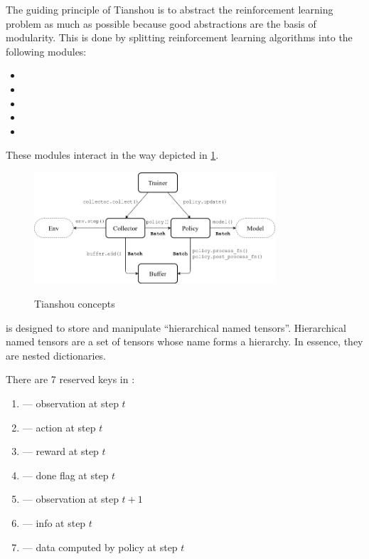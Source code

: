 The guiding principle of Tianshou is to abstract the reinforcement learning problem
as much as possible because good abstractions are the basis of modularity.
This is done by splitting reinforcement learning algorithms into the following modules:
\begin{itemize}
		\item {}
		\item {}
		\item {}
		\item {}
		\item {}
\end{itemize}

These modules interact in the way depicted in \ref{tianshou-concepts}.

\begin{figure}[htpb]
		\centering
		\includegraphics[width=0.8\textwidth]{"./figure/concepts_arch2.png"}
		\label{tianshou-concepts}
		\caption{Tianshou concepts}
\end{figure}


 is designed to store and manipulate ``hierarchical named tensors''.
Hierarchical named tensors are a set of tensors whose name forms a hierarchy.
In essence, they are nested dictionaries.

There are 7 reserved keys in :
\begin{enumerate}
		\item {} --- observation at step $ t  $
		\item {} --- action at step $ t  $
		\item {} --- reward at step $ t  $
		\item {} --- done flag at step $ t  $
		\item {} --- observation at step $ t+1  $
		\item {} --- info at step $ t  $
		\item {} --- data computed by policy at step $ t  $
\end{enumerate}

